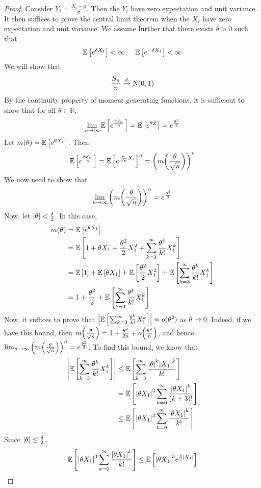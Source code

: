 \documentclass{article}
\begin{document}
\begin{proof}
	Consider $Y_i = \frac{X_i - \mu}{\sigma}$. Then the $Y_i$ have zero expectation and unit variance. It then suffices to prove the central limit theorem when the $X_i$ have zero expectation and unit variance. We assume further that there exists $\delta > 0$ such that
	\[ \mathbb{E}\left[{e^{\delta X_1}}\right] < \infty;\quad \mathbb{E}\left[{e^{-\delta X_1}}\right] < \infty \]
	We will show that
	\[ \frac{S_n}{n} \xrightarrow{d} \mathrm{N}(0, 1) \]
	By the continuity property of moment generating functions, it is sufficient to show that for all $\theta \in \mathbb R$,
	\[ \lim_{n \to \infty}\mathbb{E}\left[{e^{\frac{\theta S_n}{n}}}\right] = \mathbb{E}\left[{e^{\theta Z}}\right] = e^{\frac{\theta^2}{2}} \]
	Let $m(\theta) = \mathbb{E}\left[{e^{\theta X_1}}\right]$. Then
	\[ \mathbb{E}\left[{e^{\frac{\theta S_n}{n}}}\right] = \mathbb{E}\left[{e^{\frac{\theta}{\sqrt{n}} X_1}}\right]^n = \qty(m\qty(\frac{\theta}{\sqrt{n}}))^n \]
	We now need to show that
	\[ \lim_{n \to \infty}\qty(m\qty(\frac{\theta}{\sqrt{n}}))^n = e^{\frac{\theta^2}{2}} \]
	Now, let $\abs{\theta} < \frac{\delta}{2}$. In this case,
	\begin{align*}
		m(\theta) &= \mathbb{E}\left[{e^{\theta X_1}}\right] \\
		&= \mathbb{E}\left[{1 + \theta X_1 + \frac{\theta^2}{2} X_1^2 + \sum_{k=3}^\infty \frac{\theta^k}{k!}X_1^k}\right] \\
		&= \mathbb{E}\left[{1}\right] + \mathbb{E}\left[{\theta X_1}\right] + \mathbb{E}\left[{\frac{\theta^2}{2} X_1^2}\right] + \mathbb{E}\left[{\sum_{k=3}^\infty \frac{\theta^k}{k!}X_1^k}\right] \\
		&= 1 + \frac{\theta^2}{2} + \mathbb{E}\left[{\sum_{k=3}^\infty \frac{\theta^k}{k!}X_1^k}\right]
	\end{align*}
	Now, it suffices to prove that $\abs{\mathbb{E}\left[{\sum_{k=3}^\infty \frac{\theta^k}{k!}X_1^k}\right]} = o(\theta^2)$ as $\theta \to 0$. Indeed, if we have this bound, then $m\qty(\frac{\theta}{\sqrt{n}}) = 1 + \frac{\theta^2}{2n} + o\qty(\frac{\theta^2}{n})$, and hence $\lim_{n \to \infty}\qty(m\qty(\frac{\theta}{\sqrt{n}}))^n = e^{\frac{\theta^2}{2}}$. To find this bound, we know that
	\begin{align*}
		\abs{\mathbb{E}\left[{\sum_{k=3}^\infty \frac{\theta^k}{k!}X_1^k}\right]} &\leq \mathbb{E}\left[{\sum_{k=3}^\infty \frac{\abs{\theta}^k \abs{X_1}^k}{k!}}\right] \\
		&= \mathbb{E}\left[{\abs{\theta X_1}^3 \sum_{k=0}^\infty \frac{\abs{\theta X_1}^k}{(k+3)!}}\right] \\
		&\leq \mathbb{E}\left[{\abs{\theta X_1}^3 \sum_{k=0}^\infty \frac{\abs{\theta X_1}^k}{k!}}\right]
	\end{align*}
	Since $\abs{\theta} \leq \frac{\delta}{2}$,
	\[ \mathbb{E}\left[{\abs{\theta X_1}^3 \sum_{k=0}^\infty \frac{\abs{\theta X_1}^k}{k!}}\right] \leq \mathbb{E}\left[{\abs{\theta X_1}^3 e^{\frac{\delta}{2}\abs{X_1}}}\right] \]

\end{proof}
\end{document}

